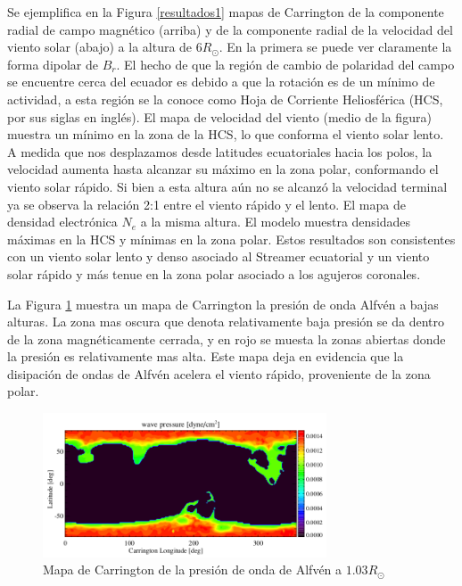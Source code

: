 \documentclass[a4paper,11pt]{report}
\begin{document}
Se ejemplifica en la Figura \ref{resultados1} mapas de Carrington de la componente radial de campo magnético (arriba) y de la componente radial de la velocidad del viento solar (abajo) a la altura de $6 R_{\odot}$. En la primera se puede ver claramente la forma dipolar de $B_r$. El hecho de que la región de cambio de polaridad del campo se encuentre cerca del ecuador es debido a que la rotación es de un mínimo de actividad, a esta región se la conoce como Hoja de Corriente Heliosférica (HCS, por sus siglas en inglés). El mapa de velocidad  del viento (medio de la figura) muestra un mínimo en la zona de la HCS, lo que conforma el viento solar lento. A medida que nos desplazamos desde latitudes ecuatoriales hacia los polos, la velocidad aumenta hasta alcanzar su máximo en la zona polar, conformando el viento solar rápido. Si bien a esta altura aún no se alcanzó la velocidad terminal ya se observa la relación 2:1 entre el viento rápido y el lento. El mapa de densidad electrónica $N_e$ a la misma altura. El modelo muestra densidades máximas en la HCS y mínimas en la zona polar. Estos resultados son consistentes con un viento solar lento y denso asociado al Streamer ecuatorial y un viento solar rápido y más tenue en la zona polar asociado a los agujeros coronales.

La Figura \ref{resultados2} muestra un mapa de Carrington la presión de onda Alfvén a bajas alturas. La zona mas oscura que denota relativamente baja presión se da dentro de la zona magnéticamente cerrada, y en rojo se muesta la zonas abiertas donde la presión es relativamente mas alta. Este mapa deja en evidencia que la disipación de ondas de Alfvén acelera el viento rápido, proveniente de la zona polar.


\begin{figure}%
\begin{center}
\includegraphics[width=0.75\textwidth]{figuras/presion_alfven_vander2010.png}
\end{center}
\caption{Mapa de Carrington de la presión de onda de Alfvén a $1.03 R_{\odot}$}
\label{resultados2}
\end{figure}
\end{document}
